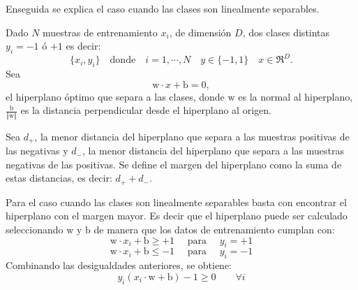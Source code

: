 Enseguida se explica el caso cuando las clases son linealmente separables.

Dado $N$ muestras de entrenamiento $x_i$, de dimensión $D$, dos clases distintas $y_i=-1$ ó $+1$ es decir: 
$$\lbrace x_i,y_i \rbrace \quad \text{donde} \quad  i=1, \cdots ,N \quad y\in \lbrace -1,1 \rbrace \quad x \in \Re^D.$$
Sea  
\begin{equation}\label{eq:hiper}
\text{w} \cdot x + \text{b} = 0 ,
\end{equation}  
el hiperplano óptimo que separa a las clases, donde $\text{w}$ es la normal al hiperplano, $\frac{\text{b}}{ \Vert \text{w} \Vert}$ es la distancia perpendicular desde el hiperplano al origen.

Sea $d_+$, la menor distancia del hiperplano que separa a las muestras positivas de las negativas y $d_-$, la menor distancia del hiperplano que separa a las muestras negativas de las positivas. Se define el margen del hiperplano como la suma de estas distancias, es decir: $d_+ + d_-$.

Para el caso cuando las clases son linealmente separables basta con encontrar el hiperplano con el margen mayor. Es decir que el hiperplano puede ser calculado seleccionando $\text{w}$ y $\text{b}$ de manera que los datos de entrenamiento cumplan con:  
\begin{equation}\label{eq:des+1}
\text{w} \cdot x_i + \text{b} \geqslant +1 \quad \textrm{ para } \quad y_i=+1
\end{equation} 
\begin{equation}\label{eq:des-1}
\text{w} \cdot x_i + \text{b} \leqslant -1 \quad \textrm{ para } \quad y_i=-1
\end{equation} 
Combinando las desigualdades anteriores, se obtiene:  
\begin{equation}
y_i(x_i \cdot \text{w} + \text{b}) -1 \geqslant 0 \qquad \forall i 
\end{equation} 


